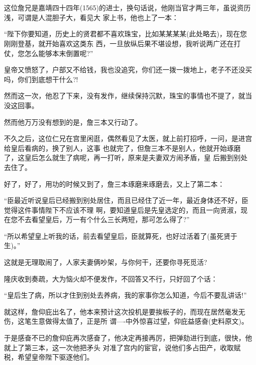 \documentclass[11pt,a4paper,onecolumn]{article}
\begin{document}
\section[\thesection]{}

这位詹兄是嘉靖四十四年(1565)的进士，换句话说，他刚当官才两三年，虽说资历浅，可谓是人混胆子大，看见大
家上书，他也上了一本：

``陛下你要知道，历史上的贤君都不喜欢珠宝，比如某某某某(此处略去)，现在您刚刚登基，就开始喜欢这类东
西，一旦放纵后果不堪设想，我听说两广还在打仗，您怎么能够本末倒置呢?''

皇帝又愤怒了，户部又不给钱，我也没追究，你们还一拨一拨地上，老子不还没买吗，你们到底想干什么?!

然而这一次，他忍了下来，没有发作，继续保持沉默，珠宝的事情也不提了，就当没这回事。

然而他万万没有想到的是，詹三本又行动了。

不久之后，这位仁兄在宫里闲逛，偶然看见了太医，就上前打招呼，一问，是进宫给皇后看病的，换了别人，这事
也就完了，但詹三本不是别人，他就开始琢磨了，这皇后怎么就生了病呢，再一打听，原来是夫妻双方闹矛盾，皇
后搬到别处去住了。

好了，好了，用功的时候又到了，詹三本琢磨来琢磨去，又上了第二本：

``臣最近听说皇后已经搬到别处居住，而且已经住了近一年，最近身体还不好，臣觉得这件事情陛下不应该不理
啊，要知道皇后是先皇选定的，而且一向贤淑，现在您不去看望皇后，万一有个什么三长两短，那可怎么得了?''

``所以希望皇上听我的话，前去看望皇后，臣就算死，也好过活着了(虽死贤于生)。''

这就是无理取闹了，人家夫妻俩吵架，与你何干，还要你寻死觅活?

隆庆收到奏疏，大为恼火却不便发作，不回答又不行，只好回了个话：

``皇后生了病，所以才住到别处去养病，我的家事你怎么知道，今后不要乱讲话!''

就这样，詹仰庇出名了，他本来预计这次投机是要挨板子的，而现在居然毫发无伤，这笔生意做得太值了，正是所
谓----中外惊喜过望，仰庇益感奋(史料原文)。

于是感奋不已的詹仰庇再次感奋了，他决定再接再厉，把弹劾进行到底，很快，他就上了第三本，这一次他把矛头
对准了宫内的宦官，说他们多占田产，收取赋税，希望皇帝陛下驱逐他们。

\section[\thesection]{}
\end{document}

